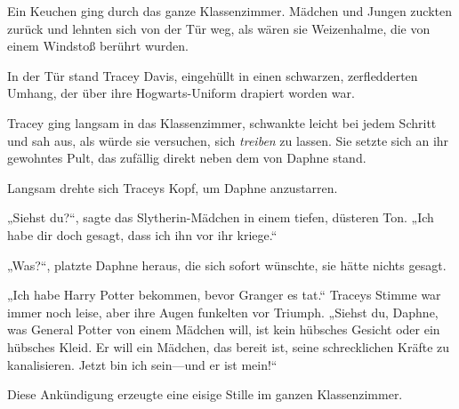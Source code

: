 Ein Keuchen ging durch das ganze Klassenzimmer. Mädchen und Jungen zuckten zurück und lehnten sich von der Tür weg, als wären sie Weizenhalme, die von einem Windstoß berührt wurden.

In der Tür stand Tracey Davis, eingehüllt in einen schwarzen, zerfledderten Umhang, der über ihre Hogwarts-Uniform drapiert worden war.

Tracey ging langsam in das Klassenzimmer, schwankte leicht bei jedem Schritt und sah aus, als würde sie versuchen, sich \emph{treiben} zu lassen. Sie setzte sich an ihr gewohntes Pult, das zufällig direkt neben dem von Daphne stand.

Langsam drehte sich Traceys Kopf, um Daphne anzustarren.

„Siehst du?“, sagte das Slytherin-Mädchen in einem tiefen, düsteren Ton.
„Ich habe dir doch gesagt, dass ich ihn vor ihr kriege.“

„Was?“, platzte Daphne heraus, die sich sofort wünschte, sie hätte nichts gesagt.

„Ich habe Harry Potter bekommen, bevor Granger es tat.“ Traceys Stimme war immer noch leise, aber ihre Augen funkelten vor Triumph.
„Siehst du, Daphne, was General Potter von einem Mädchen will, ist kein hübsches Gesicht oder ein hübsches Kleid. Er will ein Mädchen, das bereit ist, seine schrecklichen Kräfte zu kanalisieren. Jetzt bin ich sein—und er ist mein!“

Diese Ankündigung erzeugte eine eisige Stille im ganzen Klassenzimmer.

